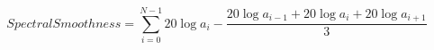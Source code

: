 \begin{equation}
\mathit{SpectralSmoothness} = \sum_{i=0}^{N-1} 20 \log a_i - \frac{20\log a_{i-1} + 20\log a_{i} + 20\log a_{i+1}}{3}
\label{eq:spectral_smoothness}
\end{equation}
